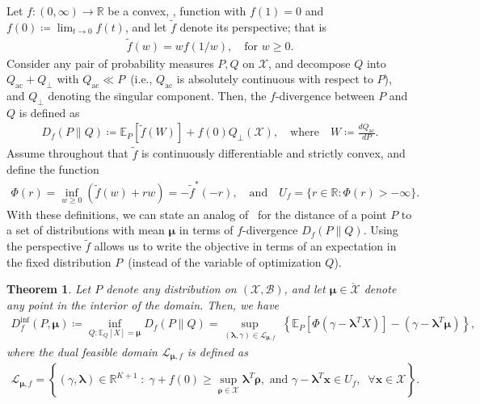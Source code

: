 \documentclass{article}
\theoremstyle{plain}
\newtheorem{theorem}{Theorem}[section]
\theoremstyle{definition}
\newcommand{\lrp}[1]{\left( #1 \right)}
\newcommand{\calX}{\mathcal X}
\newcommand{\calB}{\mathcal B}
\newcommand{\calL}{\mathcal L}
\newcommand{\xvec}{\mathbf{x}}
\newcommand{\qtext}[1]{\quad \text{#1} \quad}
\newcommand{\boldlambda}{\boldsymbol{\lambda}}
\newcommand{\boldmu}{\boldsymbol{\mu}}
\newcommand{\boldrho}{\boldsymbol{\rho}}
\newcommand{\ftilde}{\widetilde{f}}
\newcommand{\fdivdualdomain}{\calL_{\boldmu, f}}
\newcommand{\lsc}{\text{lsc}\xspace}
\begin{document}
    Let $f:(0, \infty) \to \mathbb{R}$ be a convex, \lsc, function with $f(1)=0$ and $f(0) \coloneqq \lim_{t \to 0} f(t)$, and let $\ftilde$ denote its perspective\citep[\S~2.3.3]{boyd2004convex}; that is
    \begin{align}
        \ftilde(w) = w f(1/w), \quad \text{for } w \geq 0. 
    \end{align}
    Consider any pair of probability measures $P, Q$  on $\calX$, and  decompose $Q$ into $Q_{\mathrm{ac}} + Q_\perp$ with $Q_{\mathrm{ac}} \ll P$~(i.e., $Q_{\mathrm{ac}}$ is absolutely continuous with respect to $P$), and $Q_\perp$ denoting the singular component. Then, the $f$-divergence between $P$ and $Q$ is defined as  
    \begin{align}
        D_f(P \parallel Q) \coloneqq \mathbb{E}_P\left[ \ftilde(W) \right] + f(0) Q_\perp(\calX), \qtext{where} W \coloneqq \frac{dQ_{\mathrm{ac}}}{dP}. 
    \end{align}
    Assume throughout that $\ftilde$ is continuously differentiable and strictly convex, and define the function 
    \begin{align}
        \Phi(r) = \inf_{w \geq 0} \lrp{\ftilde(w) + r w} = -\ftilde^{*}(-r), \qtext{and} U_f = \{r \in \mathbb{R}: \Phi(r)>-\infty\}. 
    \end{align}
    With these definitions, we can state an analog of~ for the distance of a point $P$ to a set of distributions with mean $\boldmu$ in terms of $f$-divergence $D_f(P \parallel Q)$. Using the perspective $\ftilde$ allows us to write the objective in terms of an expectation in the fixed distribution $P$~(instead of the variable of optimization $Q$). 
    \begin{theorem}
        \label{theorem:f-divergence} Let $P$ denote any distribution on $(\calX, \calB)$, and let $\boldmu \in \mathring{\calX}$ denote any point in the interior of the domain. Then, we have 
        \begin{align}
            D_f^{\inf}(P, \boldmu) \coloneqq \inf_{Q:\mathbb{E}_Q[X]=\boldmu} D_f(P \parallel Q) = \sup_{(\boldlambda, \gamma) \in \calL_{\boldmu, f}} \; \left\{ \mathbb{E}_P [\Phi(\gamma - \boldlambda^T X)] - (\gamma - \boldlambda^T \boldmu) \right\}, 
        \end{align}
        where the dual feasible domain $\calL_{\boldmu, f}$ is defined as 
        \begin{align}
            \fdivdualdomain = \left\{ (\gamma, \boldlambda) \in \mathbb{R}^{K+1} \;:\; \gamma + f(0) \geq \sup_{\boldrho \in \calX} \boldlambda^T \boldrho, \text{ and } \gamma - \boldlambda^T \xvec \in U_f, \;\; \forall \xvec \in \calX \right \}. 
        \end{align}
    \end{theorem}
\end{document}
